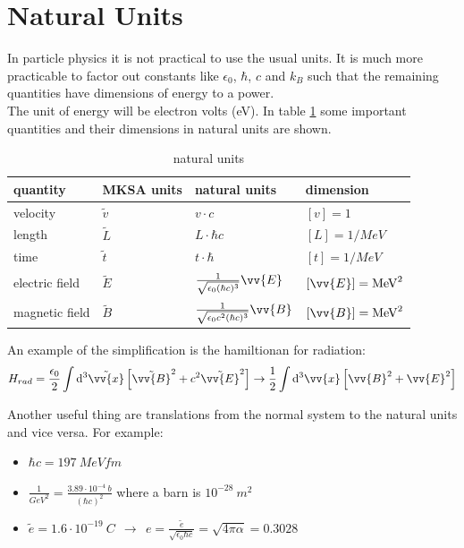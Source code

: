 \documentclass{include/thesisclass}
\newcommand{\cc}{\cdot}
\newcommand{\vx}{\vv{x}}
\newcommand{\df}{\rightarrow}
\newcommand{\dd}{{\rm d}}
\newcommand{\vB}{\vv{E}}
\newcommand{\vE}{\vv{B}}
\newcommand{\eps}{\epsilon}
\begin{document}
\section{Natural Units}
In particle physics it is not practical to use the usual units. It is much more practicable to factor out constants like $\eps_0$, $\hbar$, $c$ and $k_B$ such that the remaining quantities have dimensions of energy to a power.\\
The unit of energy will be electron volts (eV). In table \ref{units} some important quantities and their dimensions in natural units are shown.
\begin{table}[H]
\centering
\begin{tabular}{l|lll}
quantity & MKSA units & natural units & dimension\\
\midrule
velocity & $\tilde{v}$ & $v \cc c$ & $[v] = 1$\\
length & $\tilde{L}$ & $L \cc \hbar c$ & $[L] = 1/\si{MeV}$\\
time & $\tilde{t}$ & $t\cc \hbar$ & $[t] = 1/\si{MeV}$\\
electric field & $\tilde{E}$ & $\frac{1}{\sqrt{\eps_0 (\hbar c)^3}} \vv{E}$ & $[\vv{E}] = \si{MeV}^2$\\
magnetic field & $\tilde{B}$ & $\frac{1}{\sqrt{\eps_0 c^2(\hbar c)^3}} \vv{B}$ &  $[\vv{B}] = \si{MeV}^2$\\
\bottomrule
\end{tabular}
\caption{natural units}
\label{units}
\end{table}
An example of the simplification is the hamiltionan for radiation:
\[ H_{rad} = \frac{\eps_0}{2} \int\dd^3 \tilde{\vx} \left[ \tilde{\vE}^2 + c^2 \tilde{\vB}^2\right] \df \frac{1}{2} \int\dd^3 \vx \left[\vE^2 + \vB^2\right]\]

Another useful thing are translations from the normal system to the natural units and vice versa. For example:
\begin{itemize}
\item $\hbar c = 197~\si{MeV fm}$
\item $\frac{1}{\si{GeV}^2} = \frac{3.89\cc 10^{-4}~\si{b}}{(\hbar c)^2}$ where a barn is $10^{-28}~\si{m^2}$
\item $\tilde{e} = 1.6\cc 10^{-19} ~\si{C} ~~\df~~ e = \frac{\tilde{e}}{\sqrt{\eps_0 \hbar c}} = \sqrt{ 4 \pi \alpha} = 0.3028$
\end{itemize}
\end{document}
